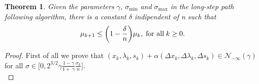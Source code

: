 \documentclass[a4paper,10 pt,titlepage,twoside]{book}
\theoremstyle{plain}
\newtheorem{thm}{Theorem}[chapter]
\theoremstyle{definition}
\theoremstyle{remark}
\begin{document}
\begin{thm}
	Given the parameters $\gamma$, $\sigma_{\text{min}}$ and $\sigma_{\text{max}}$ in the long-step path following algorithm, there is a constant $\delta$ indipendent of n such that
	\begin{equation}\label{(5.10)}
	\mu_{k+1} \leq \bigg(1 - \frac{\delta}{n}\bigg)\mu_{k}, \text{\;for all\;}k\geq0.\\
	\end{equation} 
\end{thm}
\begin{proof}
	First of all we prove that $(x_{k}, \lambda_{k}, s_{k})+\alpha(\Delta x_{k},\Delta \lambda_{k},\Delta s_{k})\in\mathcal{N}_{-\infty}(\gamma)$ for all $\sigma \in \bigg[0,2^{3/2}\gamma \frac{1 - \gamma}{1 +\ \gamma}\frac{\sigma_{k}}{n}\bigg]$.\\
	

\end{proof}
\end{document}
